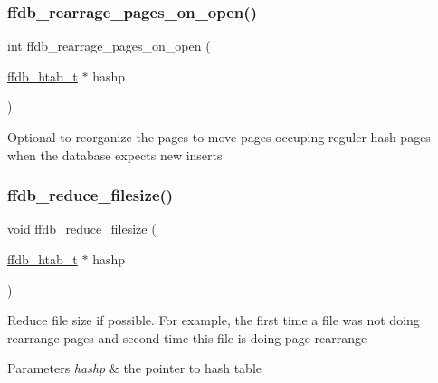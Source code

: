 \subsubsection{\texorpdfstring{ffdb\_rearrage\_pages\_on\_open()}{ffdb\_rearrage\_pages\_on\_open()}}
{\footnotesize\ttfamily int ffdb\+\_\+rearrage\+\_\+pages\+\_\+on\+\_\+open (\begin{DoxyParamCaption}\item[{\mbox{\hyperlink{adat-devel_2other__libs_2filedb_2filehash_2ffdb__hash_8h_ae592010ed2bedc975d3cc0b7d074b9d1}{ffdb\+\_\+htab\+\_\+t}} $\ast$}]{hashp }\end{DoxyParamCaption})}

Optional to reorganize the pages to move pages occuping reguler hash pages when the database expects new inserts \mbox{\label{adat-devel_2other__libs_2filedb_2filehash_2ffdb__page_8c_a89850b387b69a4649b1bd92d0e3c5d12}} 
\subsubsection{\texorpdfstring{ffdb\_reduce\_filesize()}{ffdb\_reduce\_filesize()}}
{\footnotesize\ttfamily void ffdb\+\_\+reduce\+\_\+filesize (\begin{DoxyParamCaption}\item[{\mbox{\hyperlink{adat-devel_2other__libs_2filedb_2filehash_2ffdb__hash_8h_ae592010ed2bedc975d3cc0b7d074b9d1}{ffdb\+\_\+htab\+\_\+t}} $\ast$}]{hashp }\end{DoxyParamCaption})}

Reduce file size if possible. For example, the first time a file was not doing rearrange pages and second time this file is doing page rearrange


\begin{DoxyParams}{Parameters}
{\em hashp} & the pointer to hash table \\
\hline
\end{DoxyParams}
\mbox{\label{adat-devel_2other__libs_2filedb_2filehash_2ffdb__page_8c_abcfe17261335c76475086e59ab020290}} 
